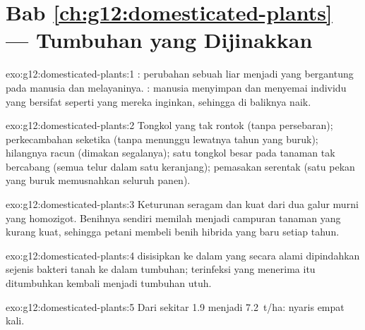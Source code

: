\section*{Bab \ref{ch:g12:domesticated-plants} --- Tumbuhan yang Dijinakkan}

\begin{solution}{exo:g12:domesticated-plants:1}
: perubahan sebuah  liar menjadi  yang
bergantung pada manusia dan melayaninya. : manusia
menyimpan dan menyemai individu yang bersifat seperti yang mereka
inginkan, sehingga  di baliknya naik.
\end{solution}

\begin{solution}{exo:g12:domesticated-plants:2}
Tongkol yang tak rontok (tanpa persebaran); perkecambahan seketika
(tanpa menunggu lewatnya tahun yang buruk); hilangnya racun (dimakan
segalanya); satu tongkol besar pada tanaman tak bercabang (semua telur
dalam satu keranjang); pemasakan serentak (satu pekan yang buruk
memusnahkan seluruh panen).
\end{solution}

\begin{solution}{exo:g12:domesticated-plants:3}
Keturunan seragam dan kuat dari dua galur murni yang homozigot.
Benihnya sendiri memilah menjadi campuran tanaman yang kurang kuat,
sehingga petani membeli benih hibrida yang baru setiap tahun.
\end{solution}

\begin{solution}{exo:g12:domesticated-plants:4}
 disisipkan ke dalam  yang secara alami dipindahkan sejenis
bakteri tanah ke dalam  tumbuhan;  terinfeksi yang menerima 
itu ditumbuhkan kembali menjadi tumbuhan utuh.
\end{solution}

\begin{solution}{exo:g12:domesticated-plants:5}
Dari sekitar \num{1.9} menjadi \qty{7.2}{t/ha}: nyaris empat kali.
\end{solution}

